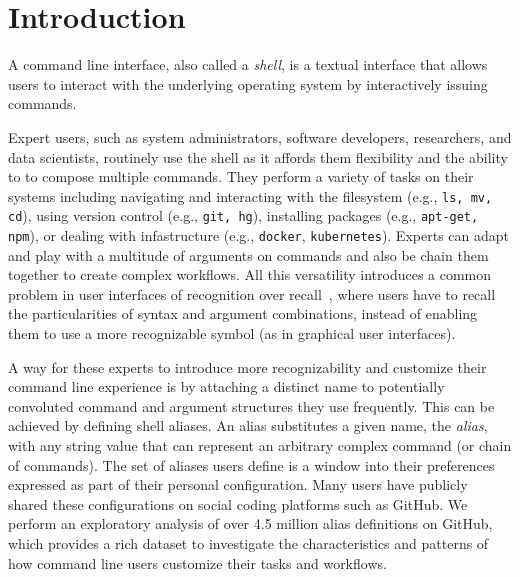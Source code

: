 \section{Introduction}

A command line interface, also called a \emph{shell}, is a textual interface that allows users to interact with the underlying operating system by interactively issuing commands.

Expert users, such as system administrators, software developers, researchers, and data scientists, routinely use the shell as it affords them flexibility and the ability to to compose multiple commands.
They perform a variety of tasks on their systems including navigating and interacting with the filesystem (e.g., \verb|ls, mv, cd|), using version control (e.g., \verb|git, hg|), installing packages (e.g., \verb|apt-get, npm|), or dealing with infastructure (e.g., \verb|docker|, \verb|kubernetes|).
Experts can adapt and play with a multitude of arguments on commands and also be chain them together to create complex workflows.
All this versatility introduces a common problem in user interfaces of recognition over recall~\cite{nielsen:05}, where users have to recall the particularities of syntax and argument combinations, instead of enabling them to use a more recognizable symbol (as in graphical user interfaces).

A way for these experts to introduce more recognizability and customize their command line experience is by attaching a distinct name to potentially convoluted command and argument structures they use frequently.
This can be achieved by defining shell aliases.
An alias substitutes a given name, the \emph{alias}, with any string value that can represent an arbitrary complex command (or chain of commands).
The set of aliases users define is a window into their preferences expressed as part of their personal configuration.
Many users have publicly shared these configurations on social coding platforms such as GitHub.
We perform an exploratory analysis of over 4.5 million alias definitions on GitHub, which provides a rich dataset to investigate the characteristics and patterns of how command line users customize their tasks and workflows.

